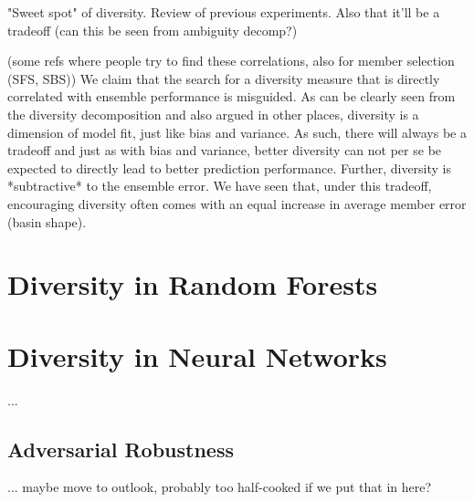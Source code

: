 \documentclass[
    a4paper, %
	fontsize=10pt, %
	twoside=false, %
]{kaobook}
\begin{document}
\begin{titlepage}

"Sweet spot" of diversity. Review of previous experiments. 
Also that it'll be a tradeoff (can this be seen from ambiguity decomp?)

(some refs where people try to find these correlations, also for member selection (SFS, SBS))
We claim that the search for a diversity measure that is directly correlated with ensemble performance is misguided. As can be clearly seen from the diversity decomposition and also argued in other places, diversity is a dimension of model fit, just like bias and variance. As such, there will always be a tradeoff and just as with bias and variance, better diversity can not per se be expected to directly lead to better prediction performance. Further, diversity is *subtractive* to the ensemble error. We have seen that, under this tradeoff, encouraging diversity often comes with an equal increase in average member error (basin shape). 

\section{Diversity in Random Forests}





\section{Diversity in Neural Networks}

...

\subsection{Adversarial Robustness}

... maybe move to outlook, probably too half-cooked if we put that in here?



\end{titlepage}
\end{document}
